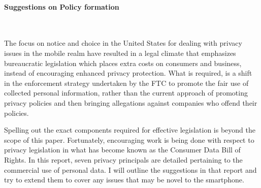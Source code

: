 


	 \paragraph{Suggestions on Policy formation} \ 


The focus on notice and choice in the United States for dealing with privacy issues in the mobile realm have resulted in a legal climate that emphasizes bureaucratic legislation which places extra costs on consumers and business, instead of encouraging enhanced privacy protection\cite{fair}.
What is required, is a shift in the enforcement strategy undertaken by the FTC to promote the fair use of collected personal information, rather than the current approach of promoting privacy policies and then bringing allegations against companies who offend their policies. 

Spelling out the exact components required for effective legislation is beyond the scope of this paper. Fortunately, encouraging work is being done with respect to privacy legislation in what has become known as the Consumer Data Bill of Rights\cite{billofrights}.
In this report, seven privacy principals are detailed pertaining to the commercial use of personal data. 
I will outline the suggestions in that report and try to extend them to cover any issues that may be novel to the smartphone.


